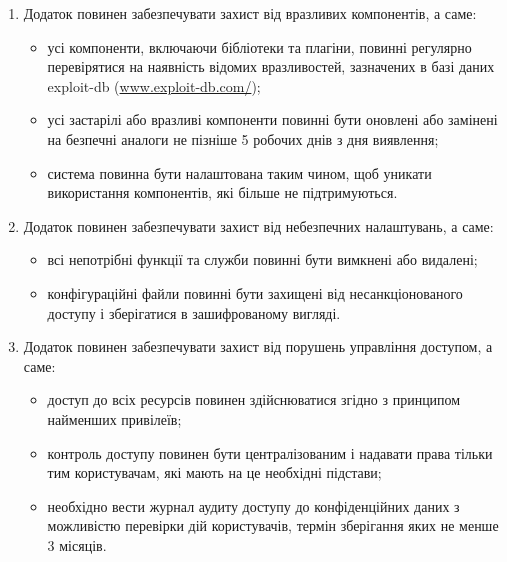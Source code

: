 \documentclass{article}
\begin{document}
\begin{enumerate}
  \item Додаток повинен забезпечувати захист від вразливих компонентів, а саме:
    \begin{itemize}
      \item усі компоненти, включаючи бібліотеки та плагіни, повинні регулярно
            перевірятися на наявність відомих вразливостей, зазначених в базі даних exploit-db (\url{www.exploit-db.com/});
      \item усі застарілі або вразливі компоненти повинні бути оновлені або замінені на безпечні аналоги не пізніше 5 робочих днів з дня виявлення;
      \item система повинна бути налаштована таким чином, щоб уникати використання компонентів, які більше не підтримуються.
    \end{itemize}

  \item Додаток повинен забезпечувати захист від небезпечних налаштувань, а саме:
    \begin{itemize}
      \item всі непотрібні функції та служби повинні бути вимкнені або видалені;
      \item конфігураційні файли повинні бути захищені від несанкціонованого доступу і зберігатися в зашифрованому вигляді.
    \end{itemize}

  \item Додаток повинен забезпечувати захист від порушень управління доступом, а саме:
    \begin{itemize}
      \item доступ до всіх ресурсів повинен здійснюватися згідно з принципом найменших привілеїв;
      \item контроль доступу повинен бути централізованим і надавати права тільки тим користувачам, які мають на це необхідні підстави;
      \item необхідно вести журнал аудиту доступу до конфіденційних даних з можливістю перевірки дій користувачів, термін зберігання яких не менше 3 місяців.
    \end{itemize}


\end{enumerate}
\end{document}
